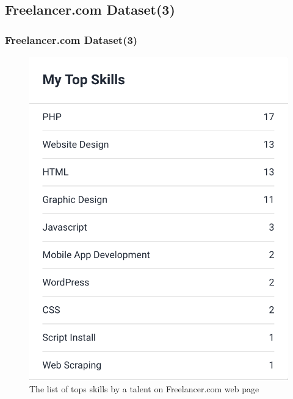 \documentclass{beamer}
\begin{document}
\subsection{Freelancer.com Dataset(3)} 
\begin{frame}
\frametitle{Freelancer.com Dataset(3)}

\begin{figure}
\includegraphics[scale=0.3]{images/FreelancerTalentSkills} 
\caption{The list of tops skills by a talent on Freelancer.com web page}
\end{figure}
\end{frame}
\end{document}
